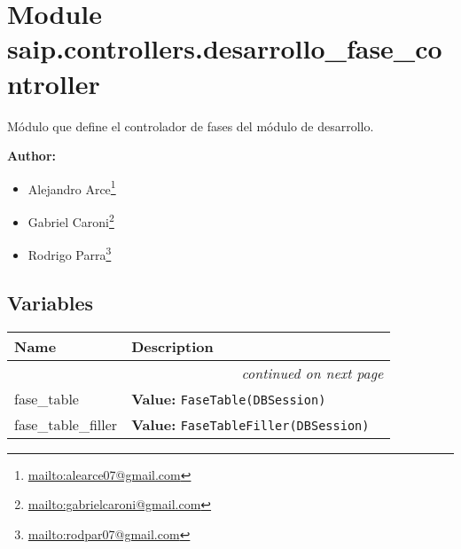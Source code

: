 %
%
%


\section{Module saip.controllers.desarrollo\_fase\_controller}

    \label{saip:controllers:desarrollo_fase_controller}
Módulo que define el controlador de fases del módulo de desarrollo.

\textbf{Author:} \begin{itemize}
\setlength{\parskip}{0.6ex}
  \item Alejandro 
    Arce\footnote{\href{mailto:alearce07@gmail.com}{mailto:alearce07@gmail.com}}

  \item Gabriel 
    Caroni\footnote{\href{mailto:gabrielcaroni@gmail.com}{mailto:gabrielcaroni@gmail.com}}

  \item Rodrigo 
    Parra\footnote{\href{mailto:rodpar07@gmail.com}{mailto:rodpar07@gmail.com}}

\end{itemize}





  \subsection{Variables}

    \vspace{-1cm}
\hspace{\varindent}\begin{longtable}{|p{\varnamewidth}|p{\vardescrwidth}|l}
\cline{1-2}
\cline{1-2} \centering \textbf{Name} & \centering \textbf{Description}& \\
\cline{1-2}
\endhead\cline{1-2}\multicolumn{3}{r}{\small\textit{continued on next page}}\\\endfoot\cline{1-2}
\endlastfoot\raggedright f\-a\-s\-e\-\_\-t\-a\-b\-l\-e\- & \raggedright \textbf{Value:} 
{\tt FaseTable(DBSession)}&\\
\cline{1-2}
\raggedright f\-a\-s\-e\-\_\-t\-a\-b\-l\-e\-\_\-f\-i\-l\-l\-e\-r\- & \raggedright \textbf{Value:} 
{\tt FaseTableFiller(DBSession)}&\\
\cline{1-2}
\end{longtable}


